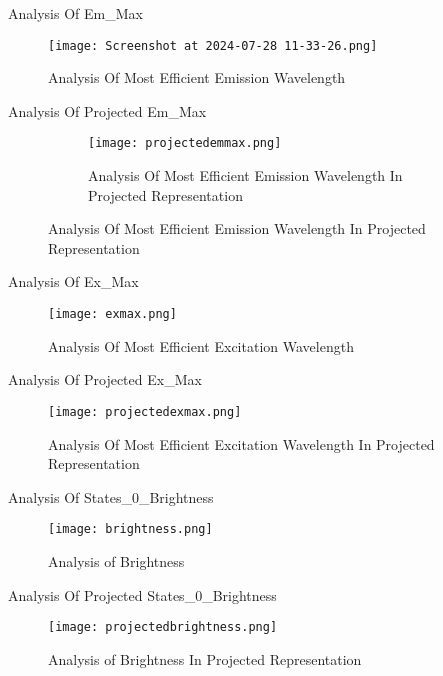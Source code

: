 \documentclass[14pt]{beamer}
\begin{document}
\begin{frame}{Analysis Of Em\_Max}
    \begin{figure}
     \centering
     \texttt{[image: Screenshot at 2024-07-28 11-33-26.png]}
     \caption{Analysis Of Most Efficient Emission Wavelength}
     \label{fig:enter-label}
    \end{figure}
\end{frame}

\begin{frame}{Analysis Of Projected Em\_Max}
    \begin{figure}
        \begin{figure}
       \centering
       \texttt{[image: projectedemmax.png]}
       \caption{Analysis Of Most Efficient Emission Wavelength In Projected Representation}
       \label{fig:enter-label}
        \end{figure}
    \end{figure}
\end{frame}

\begin{frame}{Analysis Of Ex\_Max}
    \begin{figure}
     \centering
     \texttt{[image: exmax.png]}
     \caption{Analysis Of Most Efficient Excitation Wavelength}
     \label{fig:enter-label}
    \end{figure}
    \end{frame}

\begin{frame}{Analysis Of Projected Ex\_Max}
    \begin{figure}
     \centering
     \texttt{[image: projectedexmax.png]}
     \caption{Analysis Of Most Efficient Excitation Wavelength In Projected Representation}
     \label{fig:enter-label}
    \end{figure}
\end{frame}

\begin{frame}{Analysis Of States\_0\_Brightness}
    \begin{figure}
     \centering
     \texttt{[image: brightness.png]}
     \caption{Analysis of Brightness}
     \label{fig:enter-label}
    \end{figure}
\end{frame}

\begin{frame}{Analysis Of Projected States\_0\_Brightness}
    \begin{figure}
     \centering
     \texttt{[image: projectedbrightness.png]}
     \caption{Analysis of Brightness In Projected Representation}
     \label{fig:enter-label}
    \end{figure}
\end{frame}
\end{document}

